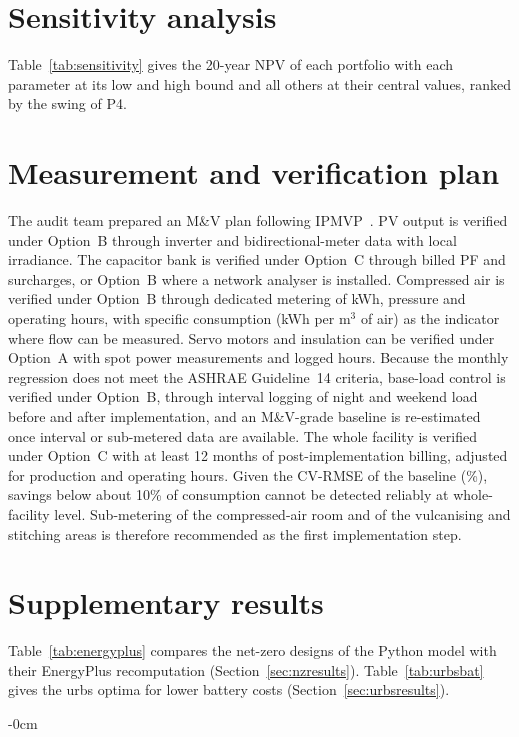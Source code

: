 \documentclass[processes,article,submit,pdftex,moreauthors]{Definitions/mdpi}
\begin{document}
\section{Sensitivity analysis}
\label{app:sens}
Table~\ref{tab:sensitivity} gives the 20-year NPV of each portfolio with each parameter at its low and high bound and all others at their central values, ranked by the swing of P4.


\section{Measurement and verification plan}
\label{app:mv}
The audit team prepared an M\&V plan following IPMVP~\cite{evo2022ipmvp}. PV output is verified under Option~B through inverter and bidirectional-meter data with local irradiance. The capacitor bank is verified under Option~C through billed PF and surcharges, or Option~B where a network analyser is installed. Compressed air is verified under Option~B through dedicated metering of kWh, pressure and operating hours, with specific consumption (kWh per m$^3$ of air) as the indicator where flow can be measured. Servo motors and insulation can be verified under Option~A with spot power measurements and logged hours. Because the monthly regression does not meet the ASHRAE Guideline~14 criteria, base-load control is verified under Option~B, through interval logging of night and weekend load before and after implementation, and an M\&V-grade baseline is re-estimated once interval or sub-metered data are available. The whole facility is verified under Option~C with at least 12 months of post-implementation billing, adjusted for production and operating hours. Given the CV-RMSE of the baseline (\nCVExcl\%), savings below about 10\% of consumption cannot be detected reliably at whole-facility level. Sub-metering of the compressed-air room and of the vulcanising and stitching areas is therefore recommended as the first implementation step.

\section{Supplementary results}
\label{app:supp}
Table~\ref{tab:energyplus} compares the net-zero designs of the Python model with their EnergyPlus recomputation (Section~\ref{sec:nzresults}). Table~\ref{tab:urbsbat} gives the urbs optima for lower battery costs (Section~\ref{sec:urbsresults}).







\begin{adjustwidth}{-\extralength}{0cm}

\PublishersNote{}
\end{adjustwidth}
\end{document}
